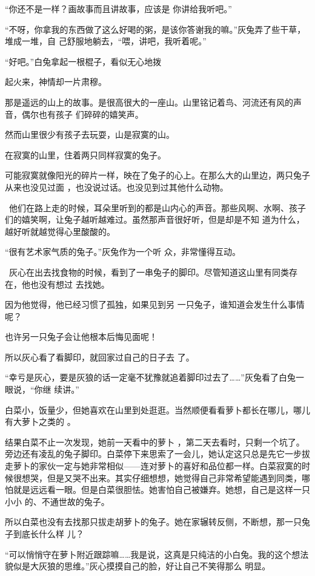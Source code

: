 \documentclass{article}
\begin{document}
“你还不是一样？画故事而且讲故事，应该是
你讲给我听吧。” 

“不呀，你拿我的东西做了这么好喝的粥，是该你答谢我的嘛。”灰兔弄了些干草，堆成一堆，自
己舒服地躺去，“喂，讲吧，我听着呢。” 

“好吧。”白兔拿起一根棍子，看似无心地拨

\newpage
起火来，神情却一片肃穆。 

那是遥远的山上的故事。是很高很大的一座山。山里铭记着鸟、河流还有风的声音，偶尔也有孩子
们碎碎的嬉笑声。 

然而山里很少有孩子去玩耍，山是寂寞的山。


在寂寞的山里，住着两只同样寂寞的兔子。 

可能寂寞就像阳光的碎片一样，映在了兔子的心上。在那么大的山里边，两只兔子从来也没见过面
，也没说过话。也没见到过其他什么动物。 

 他们在路上走的时候，耳朵里听到的都是山内心的声音。那些风啊、水啊、孩子们的嬉笑啊，让兔子越听越难过。虽然那声音很好听，但是却是不知
道为什么，越好听就越觉得心里酸酸的。 

“很有艺术家气质的兔子。”灰兔作为一个听
众，非常懂得互动。 

\newpage

 灰心在出去找食物的时候，看到了一串兔子的脚印。尽管知道这山里有同类存在，他也没有想过
去找她。 

因为他觉得，他已经习惯了孤独，如果见到另
一只兔子，谁知道会发生什么事情呢？ 


也许另一只兔子会让他根本后悔见面呢！ 

所以灰心看了看脚印，就回家过自己的日子去
了。 

“幸亏是灰心，要是灰狼的话一定毫不犹豫就追着脚印过去了……”灰兔看了白兔一眼说，“你继
续讲。” 

白菜小，饭量少，但她喜欢在山里到处逛逛。当然顺便看看萝卜都长在哪儿，哪儿有大萝卜之类的
。 

结果白菜不止一次发现，她前一天看中的萝卜
\newpage
，第二天去看时，只剩一个坑了。旁边还有凌乱的兔子脚印。白菜停下来思索了一会儿，她认定这只总是先它一步拔走萝卜的家伙一定与她非常相似——连对萝卜的喜好和品位都一样。白菜寂寞的时候很想哭，但是又哭不出来。其实仔细想想，她觉得自己非常希望能遇到同类，哪怕就是远远看一眼。但是白菜很胆怯。她害怕自己被嫌弃。她想，自己是这样一只小小
的、不通世故的兔子。 

所以白菜也没有去找那只拔走胡萝卜的兔子。她在家辗转反侧，不断想，那一只兔子到底长什么样
儿？ 

“可以悄悄守在萝卜附近跟踪嘛……我是说，这真是只纯洁的小白兔。我的这个想法貌似是大灰狼的思维。”灰心摸摸自己的脸，好让自己不笑得那么
明显。 
\end{document}
